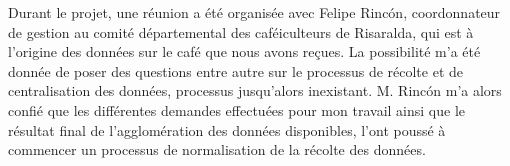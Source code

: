 










\noindent Durant le projet, une réunion a été organisée avec Felipe Rincón, coordonnateur de gestion au comité départemental des caféiculteurs de Risaralda, qui est à l'origine des données sur le café que nous avons reçues. La possibilité m'a été donnée de poser des questions entre autre sur le processus de récolte et de centralisation des données, processus jusqu'alors inexistant. M. Rincón m'a alors confié que les différentes demandes effectuées pour mon travail ainsi que le résultat final de l'agglomération des données disponibles, l'ont poussé à commencer un processus de normalisation de la récolte des données.  













